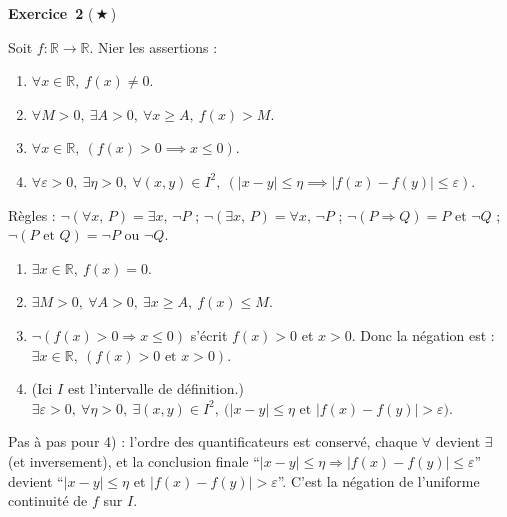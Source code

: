 \documentclass[11pt,a4paper]{article}
\newcommand{\R}{\mathbb{R}}\newcommand{\N}{\mathbb{N}}\newcommand{\Z}{\mathbb{Z}}
\newcommand{\veps}{\varepsilon}
\begin{document}
	\medskip\noindent\textbf{\Large\color{bleu}Exercice~2} \textnormal{(\,$\bigstar$\,)}\nopagebreak
	\begin{enonce}
		Soit $f:\mathbb{R}\to\mathbb{R}$. Nier les assertions  :
		\begin{enumerate}
			\item $\forall x\in\mathbb{R},\ f(x)\neq 0$.
			\item $\forall M>0,\ \exists A>0,\ \forall x\geq A,\ f(x)>M$.
			\item $\forall x\in\mathbb{R},\ (f(x)>0\implies x\leq 0)$.
			\item$\forall\varepsilon>0,\ \exists\eta>0,\ \forall(x,y)\in I^2,\ (|x-y|\leq\eta\implies |f(x)-f(y)|\leq\varepsilon)$.
		\end{enumerate}
	\end{enonce}
	\begin{corrige}
		Règles : $\neg(\forall x,\,P)=\exists x,\,\neg P$ ; $\neg(\exists x,\,P)=\forall x,\,\neg P$ ; $\neg(P\Rightarrow Q)=P\text{ et }\neg Q$ ; $\neg(P\text{ et }Q)=\neg P\text{ ou }\neg Q$.
		\begin{enumerate}
			\item $\exists x\in\R,\ f(x)=0$.
			\item $\exists M>0,\ \forall A>0,\ \exists x\geq A,\ f(x)\leq M$.
			\item $\neg(f(x)>0\Rightarrow x\leq0)$ s'écrit $f(x)>0$ et $x>0$. Donc la négation est : $\exists x\in\R,\ (f(x)>0 \text{ et } x>0)$.
			\item (Ici $I$ est l'intervalle de définition.) $\exists\veps>0,\ \forall\eta>0,\ \exists(x,y)\in I^2,\ \bigl(|x-y|\leq\eta \text{ et } |f(x)-f(y)|>\veps\bigr)$.
		\end{enumerate}
		Pas à pas pour 4) : l'ordre des quantificateurs est conservé, chaque $\forall$ devient $\exists$ (et inversement), et la conclusion finale ``$|x-y|\leq\eta\Rightarrow|f(x)-f(y)|\leq\veps$'' devient ``$|x-y|\leq\eta$ et $|f(x)-f(y)|>\veps$''. C'est la négation de l'uniforme continuité de $f$ sur $I$.
	\end{corrige}
	
\end{document}
